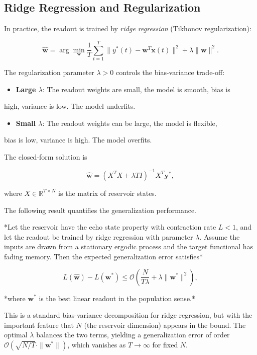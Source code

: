 \subsection{Ridge Regression and Regularization}\label{sec:15.8.3}

In practice, the readout is trained by \textit{ridge regression} (Tikhonov regularization):

\[
\hat{\mathbf{w}} = \arg\min_{\mathbf{w}} \frac{1}{T}\sum_{t=1}^{T}\|y^*(t) - \mathbf{w}^T\mathbf{x}(t)\|^2 + \lambda \|\mathbf{w}\|^2.
\]

The regularization parameter $\lambda > 0$ controls the bias-variance trade-off:

\begin{itemize}[nosep]
  \item \textbf{Large $\lambda$}: The readout weights are small, the model is smooth, bias is
\end{itemize}
  high, variance is low. The model underfits.
\begin{itemize}[nosep]
  \item \textbf{Small $\lambda$}: The readout weights can be large, the model is flexible,
\end{itemize}
  bias is low, variance is high. The model overfits.

The closed-form solution is

\[
\hat{\mathbf{w}} = (X^TX + \lambda T I)^{-1} X^T \mathbf{y}^*,
\]

where $X \in \mathbb{R}^{T \times N}$ is the matrix of reservoir states.

The following result quantifies the generalization performance.

\begin{proposition}\label{prop:15.22.}
*Let the reservoir have the echo state property with contraction
rate $L < 1$, and let the readout be trained by ridge regression with parameter
$\lambda$. Assume the inputs are drawn from a stationary ergodic process and the
target functional has fading memory. Then the expected generalization error satisfies*

\[
L(\hat{\mathbf{w}}) - L(\mathbf{w}^*) \leq \mathcal{O}\left(\frac{N}{T\lambda} + \lambda \|\mathbf{w}^*\|^2\right),
\]

*where $\mathbf{w}^*$ is the best linear readout in the population sense.*

This is a standard bias-variance decomposition for ridge regression, but with the
important feature that $N$ (the reservoir dimension) appears in the bound. The optimal
$\lambda$ balances the two terms, yielding a generalization error of order
$\mathcal{O}(\sqrt{N/T} \cdot \|\mathbf{w}^*\|)$, which vanishes as $T \to \infty$
for fixed $N$.
\end{proposition}


